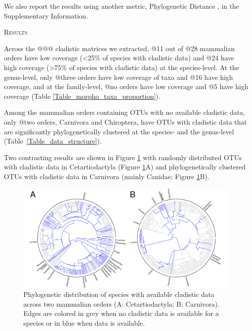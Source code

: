 \documentclass[12pt,letterpaper]{article}
\renewcommand{\section}[1]{%
\bigskip
\begin{center}
\begin{Large}
\normalfont\scshape #1
\medskip
\end{Large}
\end{center}}
\begin{document}

We also report the results using another metric, Phylogenetic Distance \citep[PD;][]{Faith19921}, in the Supplementary Information. %

%
%

\section{Results}
Across the @@@ cladistic matrices we extracted, @11 out of @28 mammalian orders have low coverage (\textless 25\% of species with cladistic data) and @24 have high coverage (\textgreater 75\% of species with cladistic data) at the species-level.
At the genus-level, only @three orders have low coverage of taxa and @16 have high coverage, and at the family-level, @no orders have low coverage and @5 have high coverage (Table \ref{Table_morpho_taxa_proportion}).



Among the mammalian orders containing OTUs with no available cladistic data, only @two orders, Carnivora and Chiroptera, have OTUs with cladistic data that are significantly phylogenetically clustered at the species- and the genus-level (Table~\ref{Table_data_structure}).

Two contrasting results are shown in Figure \ref{Figure_example_coverage} with randomly distributed OTUs with cladistic data in Cetartiodactyla (Figure \ref{Figure_example_coverage}A) and phylogenetically clustered OTUs with cladistic data in Carnivora (mainly Canidae; Figure \ref{Figure_example_coverage}B).

\begin{figure}[!htbp]
\centering
    \includegraphics[width=1\textwidth]{example_coverage.pdf}
\caption{Phylogenetic distribution of species with available cladistic data across two mammalian orders (A: Cetartiodactyla; B: Carnivora).
Edges are colored in grey when no cladistic data is available for a species or in blue when data is available.}
\label{Figure_example_coverage}
\end{figure}
\end{document}
